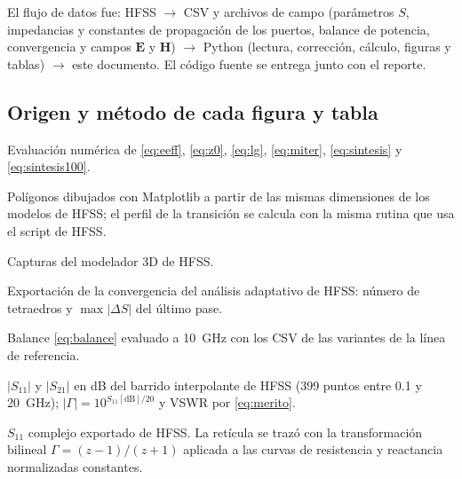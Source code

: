 \documentclass[11pt,letterpaper]{article}
\begin{document}
El flujo de datos fue: HFSS $\rightarrow$ CSV y archivos de campo (parámetros $S$, impedancias y constantes de propagación de los puertos, balance de potencia, convergencia y campos $\mathbf{E}$ y $\mathbf{H}$) $\rightarrow$ Python (lectura, corrección, cálculo, figuras y tablas) $\rightarrow$ este documento. El código fuente se entrega junto con el reporte.

\subsection{Origen y método de cada figura y tabla}
\begin{description}[style=nextline,leftmargin=0pt,itemsep=4pt,font=\normalfont\bfseries]
\item[Sección~\ref{sec:diseno} (diseño de las líneas)] Evaluación numérica de \eqref{eq:eeff}, \eqref{eq:z0}, \eqref{eq:lg}, \eqref{eq:miter}, \eqref{eq:sintesis} y \eqref{eq:sintesis100}.

\item[Figura~\ref{fig:geo} (geometría)] Polígonos dibujados con Matplotlib a partir de las mismas dimensiones de los modelos de HFSS; el perfil de la transición se calcula con la misma rutina que usa el script de HFSS.

\item[Figura~\ref{fig:hfss3d} (modelos 3D)] Capturas del modelador 3D de HFSS.

\item[Tabla~\ref{tab:conv} (convergencia)] Exportación de la convergencia del análisis adaptativo de HFSS: número de tetraedros y $\max|\Delta S|$ del último pase.

\item[Tabla~\ref{tab:diag} (diagnóstico)] Balance \eqref{eq:balance} evaluado a \SI{10}{GHz} con los CSV de las variantes de la línea de referencia.

\item[Figuras~\ref{fig:s11}, \ref{fig:gamma} y \ref{fig:s21}; Tabla~\ref{tab:sparam}] $|S_{11}|$ y $|S_{21}|$ en dB del barrido interpolante de HFSS (399 puntos entre \SI{0.1}{} y \SI{20}{GHz}); $|\Gamma|=10^{S_{11}[\mathrm{dB}]/20}$ y VSWR por \eqref{eq:merito}.

\item[Figura~\ref{fig:smith} (carta de Smith)] $S_{11}$ complejo exportado de HFSS. La retícula se trazó con la transformación bilineal $\Gamma=(z-1)/(z+1)$ aplicada a las curvas de resistencia y reactancia normalizadas constantes.


\end{description}
\end{document}
